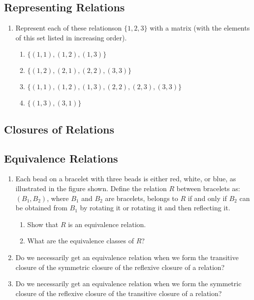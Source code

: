 \documentclass{sig-alternate-05-2015}
\begin{document}
\subsection{Representing Relations}
\begin{enumerate}
\item Represent each of these relationson $\{1, 2, 3\}$ with a matrix (with the elements of this set listed in increasing order).
\begin{enumerate}
	\item $\{(1, 1), (1, 2), (1, 3)\}$ 
	\item $\{(1, 2), (2, 1), (2, 2), (3, 3)\}$
	\item $\{(1, 1), (1, 2), (1, 3), (2, 2), (2, 3), (3, 3)\}$ 
	\item $\{(1, 3), (3, 1)\}$
\end{enumerate}

\end{enumerate}
\subsection{Closures of Relations}
\subsection{Equivalence Relations}
\begin{enumerate}
\item Each bead on a bracelet with three beads is either red,
white, or blue, as illustrated in the figure shown.
Define the relation $R$ between bracelets as: $(B_1,B_2)$,
where $B_1$ and $B_2$ are bracelets, belongs to $R$ if and only
if $B_2$ can be obtained from $B_1$ by rotating it or rotating it
and then reflecting it.
\begin{enumerate}
	\item Show that $R$ is an equivalence relation.
	\item What are the equivalence classes of $R$?
\end{enumerate}

\item Do we necessarily get an equivalence relation when we
form the transitive closure of the symmetric closure of
the reflexive closure of a relation?

\item Do we necessarily get an equivalence relation when we
form the symmetric closure of the reflexive closure of the
transitive closure of a relation?
\end{enumerate}
\end{document}
